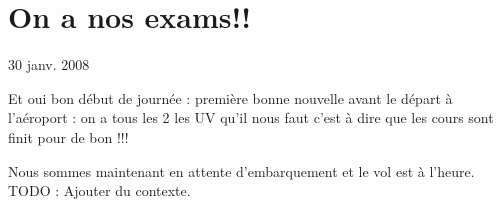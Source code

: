 \section{On a nos exams!!}

30 janv. 2008

\begin{multicols}{2}

Et oui bon début de journée : première bonne nouvelle avant le départ à l'aéroport : on a tous les 2 les UV qu'il nous faut c'est à dire que les cours sont finit pour de bon !!!

Nous sommes maintenant en attente d'embarquement et le vol est à l'heure.
TODO : Ajouter du contexte.

\end{multicols}


